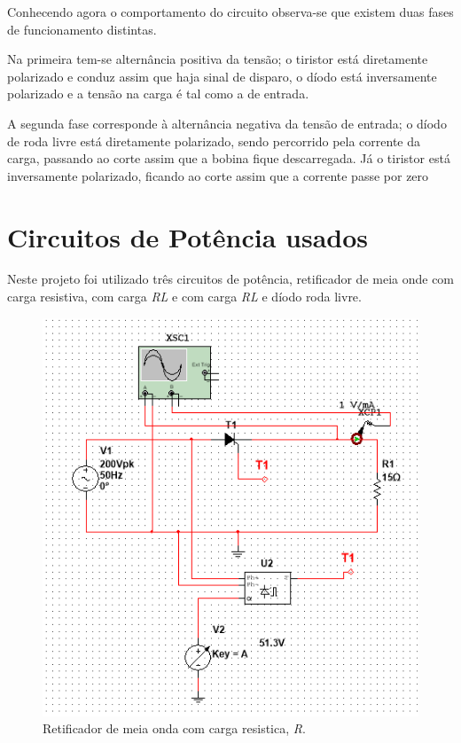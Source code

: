 \documentclass[a4paper,11pt]{article}
\numberwithin{equation}{section}
\begin{document}
Conhecendo agora o comportamento do circuito observa-se que existem duas fases de funcionamento distintas.

Na primeira tem-se alternância positiva da tensão; o tiristor está diretamente polarizado e conduz assim que haja sinal de disparo, o díodo está inversamente polarizado e a tensão na carga é tal como a de entrada.

A segunda fase corresponde à alternância negativa da tensão de entrada; o díodo de roda livre está diretamente polarizado, sendo percorrido pela corrente da carga, passando ao corte assim que a bobina fique descarregada. Já o tiristor está inversamente polarizado, ficando ao corte assim que a corrente passe por zero

\section{Circuitos de Potência usados}
Neste projeto foi utilizado três circuitos de potência, retificador de meia onde com carga resistiva, com carga \textit{RL} e com carga \textit{RL} e díodo roda livre. 

\begin{figure}[h]
	\centering
	\includegraphics[keepaspectratio=true, scale=0.5]{img/circuito1}
	\caption{Retificador de meia onda com carga resistica, \textit{R}.}
	\label{fig:circuit_3}
	\vspace{-0.8em}
\end{figure}
\end{document}
